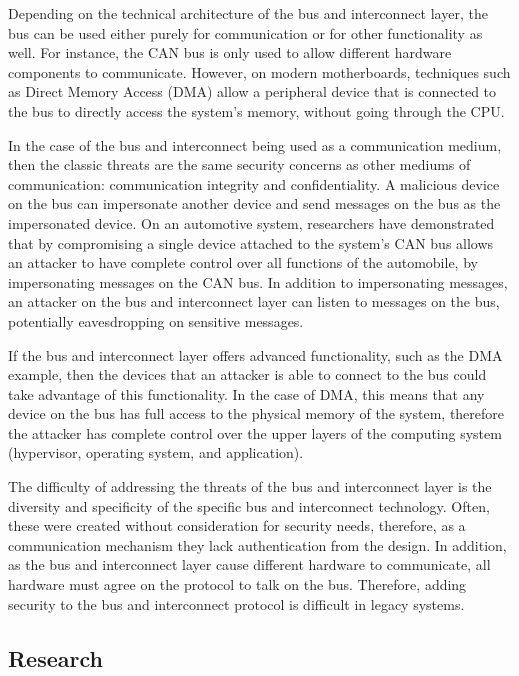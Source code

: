 \documentclass[11pt,letterpaper]{article}
\begin{document}
Depending on the technical architecture of the bus and interconnect
layer, the bus can be used either purely for communication or for
other functionality as well. For instance, the CAN bus is only used to
allow different hardware components to communicate. However, on modern
motherboards, techniques such as Direct Memory Access (DMA) allow a
peripheral device that is connected to the bus to directly access the
system's memory, without going through the CPU. 

In the case of the bus and interconnect being used as a communication
medium, then the classic threats are the same security concerns as
other mediums of communication: communication integrity and
confidentiality. A malicious device on the bus can impersonate another
device and send messages on the bus as the impersonated device. On an
automotive system, researchers have demonstrated that by compromising
a single device attached to the system's CAN bus allows an attacker to
have complete control over all functions of the automobile, by
impersonating messages on the CAN bus. In addition to impersonating
messages, an attacker on the bus and interconnect layer can listen to
messages on the bus, potentially eavesdropping on sensitive messages.

If the bus and interconnect layer offers advanced functionality, such
as the DMA example, then the devices that an attacker is able to connect
to the bus could take advantage of this functionality. In the case of
DMA, this means that any device on the bus has full access to the
physical memory of the system, therefore the attacker has complete
control over the upper layers of the computing system (hypervisor,
operating system, and application).

The difficulty of addressing the threats of the bus and interconnect
layer is the diversity and specificity of the specific bus and
interconnect technology. Often, these were created without
consideration for security needs, therefore, as a communication
mechanism they lack authentication from the design. In addition, as
the bus and interconnect layer cause different hardware to
communicate, all hardware must agree on the protocol to talk on the
bus. Therefore, adding security to the bus and interconnect protocol
is difficult in legacy systems.  

\subsection{Research}
\end{document}
